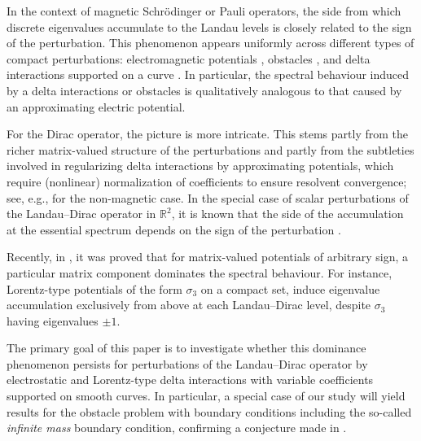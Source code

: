\documentclass[11pt,a4paper,reqno,oneside]{amsproc}
\def \rr {{\mathbb R}}
\numberwithin{equation}{section}
\begin{document}
	In the context of magnetic  Schr\"odinger or Pauli operators, the side from which discrete  eigenvalues accumulate  to the Landau levels is closely related to the sign of the perturbation. This phenomenon appears uniformly across different types of compact  perturbations:  electromagnetic potentials \cite{ RaWa02, FiPu06, MeRo07, RoTa08, PuRo11}, obstacles  \cite{PushRoz07, Pe09, GoKaPe16}, and  delta interactions supported on a curve \cite{BHOP20}. In particular, the spectral behaviour induced by a delta interactions or obstacles is qualitatively analogous to that caused by an approximating electric potential.

For the Dirac operator, the picture is more intricate. This stems partly from the richer matrix-valued structure of the perturbations and partly from the subtleties involved in regularizing delta interactions by approximating potentials, which require (nonlinear) normalization of coefficients to ensure resolvent convergence;  see, e.g., \cite{CaLoMaTu23, BHT23} for the non-magnetic case.  In the special case of scalar perturbations of the Landau--Dirac operator in $\rr^2$, it is known that the side of the accumulation at the essential spectrum depends on the sign of the perturbation \cite{MeRo07}.  

Recently, in \cite{BM}, it was proved that for matrix-valued potentials of arbitrary sign, a particular matrix component dominates the spectral behaviour. For instance,  Lorentz-type potentials of the form $\sigma_3$ on a compact set,  induce eigenvalue accumulation exclusively from above at each Landau--Dirac level, despite $\sigma_3$ having eigenvalues $\pm 1$. 

The primary goal of this paper is to investigate whether this dominance phenomenon persists for perturbations of the Landau--Dirac operator by electrostatic and Lorentz-type delta interactions with variable coefficients    supported on smooth curves. In particular, a special case of our study will yield results for the obstacle problem with boundary conditions including the so-called {\it infinite mass} boundary condition, confirming a conjecture made in \cite{BM}. 
\end{document}
